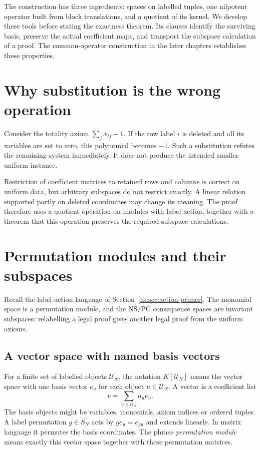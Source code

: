 \documentclass[11pt,a4paper,oneside,openany]{book}
\theoremstyle{definition}\newtheorem{definition}[theorem]{Definition}
\theoremstyle{remark}\newtheorem{remark}[theorem]{Remark}
\numberwithin{equation}{chapter}
\begin{document}
The construction has three ingredients: spaces on labelled tuples,
one nilpotent operator built from block translations, and a quotient
of its kernel. We develop these tools before stating the exactness
theorem. Its clauses identify the surviving basis, preserve the
actual coefficient maps, and transport the subspace calculation
of a proof. The common-operator construction in the later chapters
establishes these properties.

\section{Why substitution is the wrong operation}
Consider the totality axiom $\sum_jx_{ij}-1$. If the row label $i$ is
deleted and all its variables are set to zero, this polynomial becomes
$-1$. Such a substitution refutes the remaining system immediately.
It does not produce the intended smaller uniform instance.

Restriction of coefficient matrices to retained rows and columns is
correct on uniform data, but arbitrary subspaces do not restrict exactly.
A linear relation supported partly on deleted coordinates may change its
meaning. The proof therefore uses a quotient operation on modules with
label action, together with a theorem that this operation preserves the
required subspace calculations.

\section{Permutation modules and their subspaces}
Recall the label-action language of Section~\ref{tx:sec:action-primer}.
The monomial space is a permutation module, and the NS/PC consequence
spaces are invariant subspaces: relabelling a legal proof gives another
legal proof from the uniform axioms.

\subsection*{A vector space with named basis vectors}
For a finite set of labelled objects $\mathcal U_N$, the notation
$K[\mathcal U_N]$ means the vector space with one basis vector $e_u$
for each object $u\in\mathcal U_N$. A vector is a coefficient list
\[
                         v=\sum_{u\in\mathcal U_N}a_u e_u.
\]
The basis objects might be variables, monomials, axiom indices or
ordered tuples. A label permutation $g\in S_N$ acts by
$g e_u=e_{g u}$ and extends linearly. In matrix language it permutes
the basis coordinates. The phrase \emph{permutation module} means
exactly this vector space together with these permutation matrices.
\end{document}
